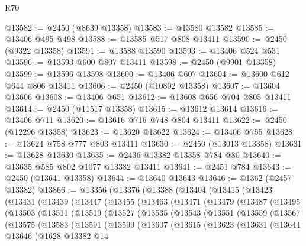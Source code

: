 \begin{lexlean}{R70}
\begin{coremodule}
@13582 := @2450 (@8639 @13358)
@13583 := @13580 @13582
@13585 := @13406 @495 @498
@13588 := @13585 @517 @808 @13411
@13590 := @2450 (@9322 @13358)
@13591 := @13588 @13590
@13593 := @13406 @524 @531
@13596 := @13593 @600 @807 @13411
@13598 := @2450 (@9901 @13358)
@13599 := @13596 @13598
@13600 := @13406 @607
@13604 := @13600 @612 @644 @806 @13411
@13606 := @2450 (@10802 @13358)
@13607 := @13604 @13606
@13608 := @13406 @651
@13612 := @13608 @656 @704 @805 @13411
@13614 := @2450 (@11517 @13358)
@13615 := @13612 @13614
@13616 := @13406 @711
@13620 := @13616 @716 @748 @804 @13411
@13622 := @2450 (@12296 @13358)
@13623 := @13620 @13622
@13624 := @13406 @755
@13628 := @13624 @758 @777 @803 @13411
@13630 := @2450 (@13013 @13358)
@13631 := @13628 @13630
@13635 := @2436 @13382 @13358 @784 @80
@13640 := @13635 @585 @802 @1077 @13382 @13411
@13641 := @2451 @784
@13643 := @2450 (@13641 @13358)
@13644 := @13640 @13643
@13646 := @1362 (@2457 @13382)
@13866 := @13356
    (@13376
      (@13388
        (@13404
          (@13415
            (@13423
              (@13431
                (@13439
                  (@13447
                    (@13455
                      (@13463
                        (@13471
                          (@13479
                            (@13487
                              (@13495
                                (@13503
                                  (@13511
                                    (@13519
                                      (@13527
                                        (@13535
                                          (@13543
                                            (@13551
                                              (@13559
                                                (@13567
                                                  (@13575
                                                    (@13583
                                                      (@13591
                                                        (@13599
                                                          (@13607
                                                            (@13615
                                                              (@13623
                                                                (@13631
                                                                  (@13644
                                                                    @13646
                                                                    (@1628
                                                                      @13382
                                                                      @14

\end{coremodule}
\end{lexlean}
